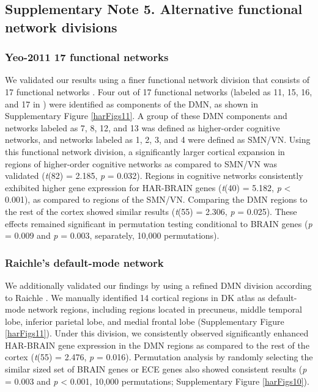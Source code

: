 \begin{refsection}
\subsection*{Supplementary Note 5. Alternative functional network divisions}
\subsubsection*{Yeo-2011 17 functional networks}
We validated our results using a finer functional network division that consists of 17 functional networks \citep{thomas2011organization}. Four out of 17 functional networks (labeled as 11, 15, 16, and 17 in \citep{thomas2011organization}) were identified as components of the DMN, as shown in Supplementary Figure \ref{harFigs11}. A group of these DMN components and networks labeled as 7, 8, 12, and 13 was defined as higher-order cognitive networks, and networks labeled as 1, 2, 3, and 4 were defined as SMN/VN. Using this functional network division, a significantly larger cortical expansion in regions of higher-order cognitive networks as compared to SMN/VN was validated (\textit{t}(82) = 2.185, \textit{p} = 0.032). Regions in cognitive networks consistently exhibited higher gene expression for HAR-BRAIN genes (\textit{t}(40) = 5.182, \textit{p} < 0.001), as compared to regions of the SMN/VN. Comparing the DMN regions to the rest of the cortex showed similar results (\textit{t}(55) = 2.306, \textit{p} = 0.025). These effects remained significant in permutation testing conditional to BRAIN genes (\textit{p} = 0.009 and \textit{p} = 0.003, separately, 10,000 permutations).

\subsubsection*{Raichle’s default-mode network}
We additionally validated our findings by using a refined DMN division according to Raichle \citep{raichle2015brain}. We manually identified 14 cortical regions in DK atlas as default-mode network regions, including regions located in precuneus, middle temporal lobe, inferior parietal lobe, and medial frontal lobe (Supplementary Figure \ref{harFigs11}). Under this division, we consistently observed significantly enhanced HAR-BRAIN gene expression in the DMN regions as compared to the rest of the cortex (\textit{t}(55) = 2.476, \textit{p} = 0.016). Permutation analysis by randomly selecting the similar sized set of BRAIN genes or ECE genes also showed consistent results (\textit{p} = 0.003 and \textit{p} < 0.001, 10,000 permutations; Supplementary Figure \ref{harFigs10}).


\end{refsection}

